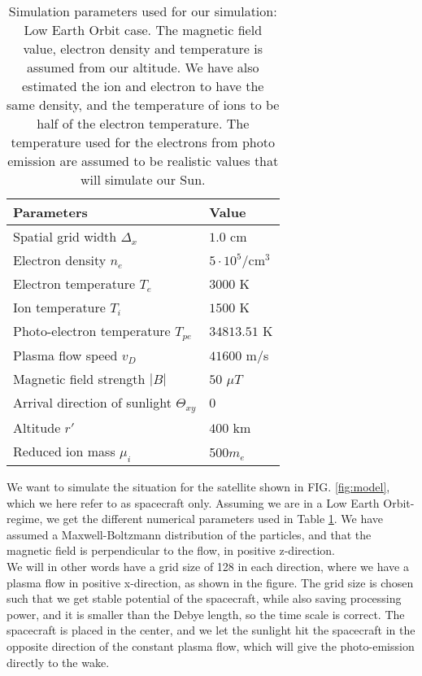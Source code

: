 \documentclass[aip, 
rsi, 
amsmath,
amssymb,
longbibliography,
reprint]{revtex4-1}
\begin{document}
\begin{table}
  \centering
  \caption{Simulation parameters used for our simulation: Low Earth Orbit case. The magnetic field value, electron density and temperature is assumed from our altitude. We have also estimated the ion and electron to have the same density, and the temperature of ions to be half of the electron temperature. The temperature used for the electrons from photo emission are assumed to be realistic values that will simulate our Sun.\label{tab:table1}}
\begin{tabular}{|l|l|}
\hline
\hline
  Parameters & Value  \\
  \hline
   Spatial grid width \(\Delta_x\) & \(1.0\) cm \\
   Electron density \(n_e\) & \(5 \cdot 10^5\)/cm$^3$   \\
   Electron temperature \(T_e\) & \(3000\) K   \\
   Ion temperature \(T_i\) & \(1500\) K \\
   Photo-electron temperature \(T_{pe}\) & \(34813.51\) K  \\
   Plasma flow speed \(v_D\)  & \(41600\) m/s  \\
   Magnetic field strength \(|B|\) & \(50 \)  \(\mu T\) \\
   Arrival direction of sunlight \(\Theta_{xy}\) & \(0\)\\
   Altitude \(r'\) & \(400\) km \\
   Reduced ion mass $\mu_i$ & 500$m_e$ \\
   \hline
\hline
\end{tabular}
\end{table}

We want to simulate the situation for the satellite shown in FIG. \ref{fig:model}, which we here refer to as spacecraft only. Assuming we are in a Low Earth Orbit-regime, we get the different numerical parameters used in Table \ref{tab:table1}. We have  assumed a Maxwell-Boltzmann distribution of the particles, and that the magnetic field is perpendicular to the flow, in positive z-direction.\\

 We will in other words have a grid size of 128 in each direction, where we have a plasma flow in positive x-direction, as shown in the figure. The grid size is chosen such that we get stable potential of the spacecraft, while also saving processing power, and it is smaller than the Debye length, so the time scale is correct. The spacecraft is placed in the center, and we let the sunlight hit the spacecraft in the opposite direction of the constant plasma flow, which will give the photo-emission directly to the wake.\\
 
\end{document}
